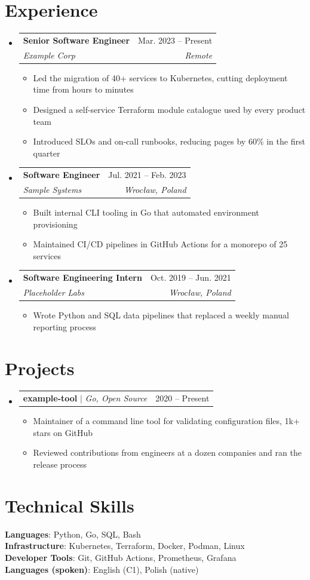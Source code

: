 \documentclass[{{ cookiecutter.paper_size }}paper,11pt]{article}
\makeatletter
\newcommand{\resumeItem}[1]{
  \item\small{
    {#1 \vspace{-2pt}}
  }
}
\newcommand{\resumeSubheading}[4]{
  \vspace{-2pt}\item
    \begin{tabular*}{0.97\textwidth}[t]{l@{\extracolsep{\fill}}r}
      \textbf{#1} & #2 \\
      \textit{\small#3} & \textit{\small #4} \\
    \end{tabular*}\vspace{-7pt}
}
\newcommand{\resumeProjectHeading}[2]{
    \item
    \begin{tabular*}{0.97\textwidth}{l@{\extracolsep{\fill}}r}
      \small#1 & #2 \\
    \end{tabular*}\vspace{-7pt}
}
\newcommand{\resumeSubHeadingListStart}{\begin{itemize}[leftmargin=0.15in, label={}]}
\newcommand{\resumeSubHeadingListEnd}{\end{itemize}}
\newcommand{\resumeItemListStart}{\begin{itemize}}
\newcommand{\resumeItemListEnd}{\end{itemize}\vspace{-5pt}}
\makeatother
\begin{document}
{{%
\section{Experience}
  \resumeSubHeadingListStart

    \resumeSubheading
      {Senior Software Engineer}{Mar. 2023 -- Present}
      {Example Corp}{Remote}
      \resumeItemListStart
        \resumeItem{Led the migration of 40+ services to Kubernetes, cutting deployment time from hours to minutes}
        \resumeItem{Designed a self-service Terraform module catalogue used by every product team}
        \resumeItem{Introduced SLOs and on-call runbooks, reducing pages by 60\% in the first quarter}
      \resumeItemListEnd

    \resumeSubheading
      {Software Engineer}{Jul. 2021 -- Feb. 2023}
      {Sample Systems}{Wroc\l{}aw, Poland}
      \resumeItemListStart
        \resumeItem{Built internal CLI tooling in Go that automated environment provisioning}
        \resumeItem{Maintained CI/CD pipelines in GitHub Actions for a monorepo of 25 services}
      \resumeItemListEnd

    \resumeSubheading
      {Software Engineering Intern}{Oct. 2019 -- Jun. 2021}
      {Placeholder Labs}{Wroc\l{}aw, Poland}
      \resumeItemListStart
        \resumeItem{Wrote Python and SQL data pipelines that replaced a weekly manual reporting process}
      \resumeItemListEnd

  \resumeSubHeadingListEnd


\section{Projects}
    \resumeSubHeadingListStart
      \resumeProjectHeading
          {\textbf{example-tool} $|$ \emph{Go, Open Source}}{2020 -- Present}
          \resumeItemListStart
            \resumeItem{Maintainer of a command line tool for validating configuration files, 1k+ stars on GitHub}
            \resumeItem{Reviewed contributions from engineers at a dozen companies and ran the release process}
          \resumeItemListEnd
    \resumeSubHeadingListEnd


\section{Technical Skills}
 \begin{itemize}[leftmargin=0.15in, label={}]
    \small{\item{
     \textbf{Languages}{: Python, Go, SQL, Bash} \\
     \textbf{Infrastructure}{: Kubernetes, Terraform, Docker, Podman, Linux} \\
     \textbf{Developer Tools}{: Git, GitHub Actions, Prometheus, Grafana} \\
     \textbf{Languages (spoken)}{: English (C1), Polish (native)}
    }}
 \end{itemize}
{%

}}}
\end{document}
